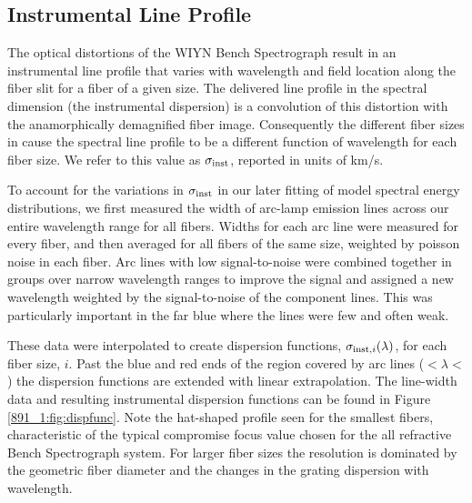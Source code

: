 \subsection{Instrumental Line Profile}
\label{891_1:sec:GPak_dispersion}

The optical distortions of the WIYN Bench Spectrograph result in an
instrumental line profile that varies with wavelength and field
location along the fiber slit for a fiber of a given size. The
delivered line profile in the spectral dimension (the instrumental
dispersion) is a convolution of this distortion with the
anamorphically demagnified fiber image. Consequently the different
fiber sizes in \GP cause the spectral line profile to be a different
function of wavelength for each fiber size. We refer to this value as
$\sigma_{\rm inst}$, reported in units of km/s.

To account for the variations in $\sigma_{\rm inst}$ in our later
fitting of model spectral energy distributions, we first measured the
width of arc-lamp emission lines across our entire wavelength range
for all fibers. Widths for each arc line were measured for every
fiber, and then averaged for all fibers of the same size, weighted by
poisson noise in each fiber. Arc lines with low signal-to-noise were
combined together in groups over narrow wavelength ranges to improve
the signal and assigned a new wavelength weighted by the
signal-to-noise of the component lines. This was particularly
important in the far blue where the lines were few and often
weak.

These data were interpolated to create dispersion functions,
$\sigma_{{\rm inst},i}(\lambda)$, for each fiber size, $i$. Past the
blue and red ends of the region covered by arc lines
($<\lambda <$ ) the dispersion functions
are extended with linear extrapolation. The line-width data and
resulting instrumental dispersion functions can be found in Figure
\ref{891_1:fig:dispfunc}. Note the hat-shaped profile seen for the smallest
fibers, characteristic of the typical compromise focus value chosen
for the all refractive Bench Spectrograph system. For larger fiber
sizes the resolution is dominated by the geometric fiber diameter and
the changes in the grating dispersion with wavelength.



